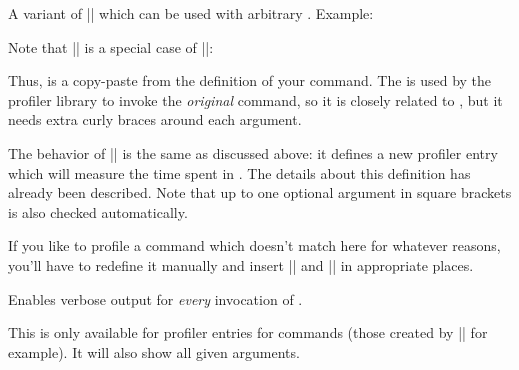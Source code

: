 \begin{command}{\pgfprofilenewforcommandpattern{}}
    A variant of |\pgfprofilenewforcommand| which can be used with arbitrary
    . Example:

    Note that |\pgfprofilenewforcommand| is a special case of
    |\pgfprofilenewforcommandpattern|:
\begin{codeexample}
\def\mymacro#1#2{ ... }
\pgfprofilenewforcommand{}
\end{codeexample}
    Thus,  is a copy-paste from the definition of your
    command. The  is used by the profiler library to
    invoke the \emph{original} command, so it is closely related to
    , but it needs extra curly braces around each
    argument.

    The behavior of |\pgfprofilenewforcommandpattern| is the same as discussed
    above: it defines a new profiler entry which will measure the time spent in
    . The details about this definition has already
    been described. Note that up to one optional argument in square brackets is
    also checked automatically.

    If you like to profile a command which doesn't match here for whatever
    reasons, you'll have to redefine it manually and insert |\pgfprofilestart|
    and |\pgfprofileend| in appropriate places.
\end{command}

\begin{command}{\pgfprofileshowinvocationsfor{}}
    Enables verbose output for \emph{every} invocation of .

    This is only available for profiler entries for commands (those created by
    |\pgfprofilenewforcommand| for example). It will also show all given
    arguments.
\end{command}


